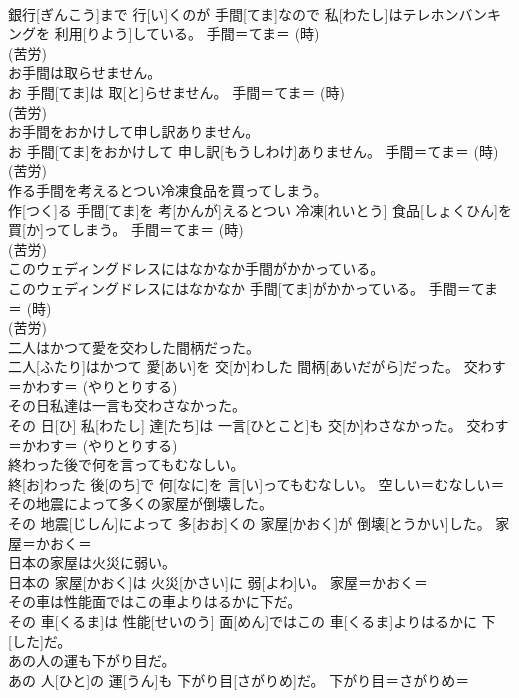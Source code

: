 \documentclass[8pt]{extreport}
\begin{document}
\begin{CJK}{UTF8}{min}
{\\	銀行[ぎんこう]まで 行[い]くのが 手間[てま]なので 私[わたし]はテレホンバンキングを 利用[りよう]している。	手間＝てま＝ (時) 
\\	(苦労) 
\\	お手間は取らせません。	
\\	お 手間[てま]は 取[と]らせません。	手間＝てま＝ (時) 
\\	(苦労) 
\\	お手間をおかけして申し訳ありません。	
\\	お 手間[てま]をおかけして 申し訳[もうしわけ]ありません。	手間＝てま＝ (時) 
\\	(苦労) 
\\	作る手間を考えるとつい冷凍食品を買ってしまう。	
\\	作[つく]る 手間[てま]を 考[かんが]えるとつい 冷凍[れいとう] 食品[しょくひん]を 買[か]ってしまう。	手間＝てま＝ (時) 
\\	(苦労) 
\\	このウェディングドレスにはなかなか手間がかかっている。	
\\	このウェディングドレスにはなかなか 手間[てま]がかかっている。	手間＝てま＝ (時) 
\\	(苦労) 
\\	二人はかつて愛を交わした間柄だった。	
\\	二人[ふたり]はかつて 愛[あい]を 交[か]わした 間柄[あいだがら]だった。	交わす＝かわす＝ (やりとりする) 
\\	その日私達は一言も交わさなかった。	
\\	その 日[ひ] 私[わたし] 達[たち]は 一言[ひとこと]も 交[か]わさなかった。	交わす＝かわす＝ (やりとりする) 
\\	終わった後で何を言ってもむなしい。	
\\	終[お]わった 後[のち]で 何[なに]を 言[い]ってもむなしい。	空しい＝むなしい＝ 
\\	その地震によって多くの家屋が倒壊した。	
\\	その 地震[じしん]によって 多[おお]くの 家屋[かおく]が 倒壊[とうかい]した。	家屋＝かおく＝ 
\\	日本の家屋は火災に弱い。	
\\	日本の 家屋[かおく]は 火災[かさい]に 弱[よわ]い。	家屋＝かおく＝ 
\\	その車は性能面ではこの車よりはるかに下だ。	
\\	その 車[くるま]は 性能[せいのう] 面[めん]ではこの 車[くるま]よりはるかに 下[した]だ。	
\\	あの人の運も下がり目だ。	
\\	あの 人[ひと]の 運[うん]も 下がり目[さがりめ]だ。	下がり目＝さがりめ＝ 
}
\end{CJK}
\end{document}
